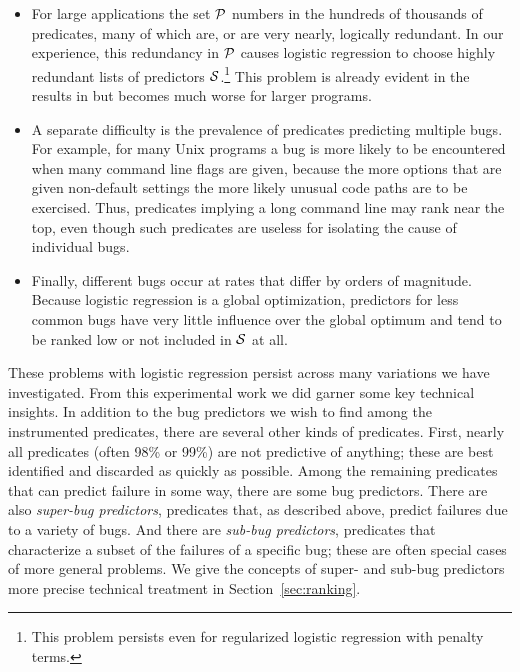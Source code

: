 \documentclass[draft]{sig-alternate}
\begin{document}
\begin{itemize}

\item For large applications the set ${\cal P}$ numbers in the hundreds of
thousands of predicates, many of which are, or are very nearly,
logically redundant.  In our experience, this redundancy in ${\cal P}$
causes logistic regression to choose highly redundant lists of
predictors ${\cal S}$.\footnote{This problem persists even for
regularized logistic regression with penalty terms.}  This problem is
already evident in the results in \cite{PLDI`03*141} but becomes much
worse for larger programs.

\item A separate difficulty is the prevalence of predicates predicting
multiple bugs.  For example, for many Unix programs a bug is more
likely to be encountered when many command line flags are given,
because the more options that are given non-default settings the more
likely unusual code paths are to be exercised.  Thus, predicates
implying a long command line may rank near the top, even though such
predicates are useless for isolating the cause of individual bugs.

\item Finally, different bugs occur at rates that differ by orders of
magnitude.  Because logistic regression is a global optimization,
predictors for less common bugs have very little influence over the
global optimum and tend to be ranked low or not included in ${\cal S}$
at all.

\end{itemize}

These problems with logistic regression persist across many variations
we have investigated. From this experimental work we did garner some
key technical insights.  In addition to the bug predictors we wish to
find among the instrumented predicates, there are several other kinds
of predicates.  First, nearly all predicates (often 98\% or 99\%) are
not predictive of anything; these are best identified and discarded as
quickly as possible. Among the remaining predicates that can
predict failure in some way, there are some bug predictors.
There are also {\em super-bug predictors}, predicates that, as
described above, predict failures due to a variety of bugs.  And there
are {\em sub-bug predictors}, predicates that characterize a subset of
the failures of a specific bug; these are often special cases of more
general problems.  We give the concepts of super- and sub-bug
predictors more precise technical treatment in
Section~\ref{sec:ranking}.
\end{document}
